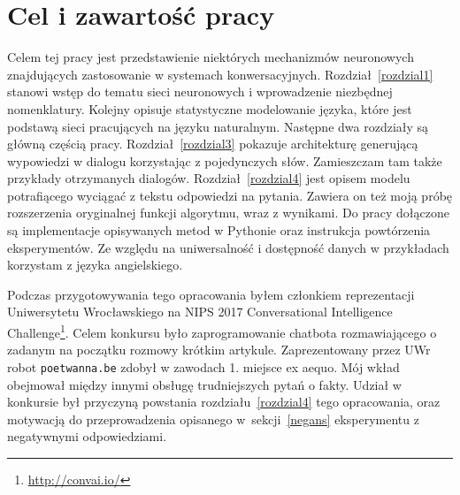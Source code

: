 \section{Cel i zawartość pracy} \label{celpracy}

Celem tej pracy jest przedstawienie niektórych mechanizmów neuronowych znajdujących zastosowanie w systemach konwersacyjnych. Rozdział~\ref{rozdzial1} stanowi wstęp do tematu sieci neuronowych i wprowadzenie niezbędnej nomenklatury. Kolejny opisuje statystyczne modelowanie języka, które jest podstawą sieci pracujących na języku naturalnym. Następne dwa rozdziały są główną częścią pracy. Rozdział~\ref{rozdzial3} pokazuje architekturę generującą wypowiedzi w dialogu korzystając z pojedynczych słów. Zamieszczam tam także przykłady otrzymanych dialogów. Rozdział~\ref{rozdzial4} jest opisem modelu potrafiącego wyciągać z tekstu odpowiedzi na pytania. Zawiera on też moją próbę rozszerzenia oryginalnej funkcji algorytmu, wraz z wynikami. Do pracy dołączone są implementacje opisywanych metod w Pythonie oraz instrukcja powtórzenia eksperymentów. Ze względu na uniwersalność i dostępność danych w przykładach korzystam z języka angielskiego.

Podczas przygotowywania tego opracowania byłem członkiem reprezentacji Uniwersytetu Wrocławskiego na NIPS 2017 Conversational Intelligence Challenge\footnote{\url{http://convai.io/}}. Celem konkursu było zaprogramowanie chatbota rozmawiającego o zadanym na początku rozmowy krótkim artykule. Zaprezentowany przez UWr robot \texttt{poetwanna.be} zdobył w zawodach 1. miejsce ex aequo. Mój wkład obejmował między innymi obsługę trudniejszych pytań o fakty. Udział w konkursie był przyczyną powstania rozdziału~\ref{rozdzial4} tego opracowania, oraz motywacją do przeprowadzenia opisanego w~sekcji~\ref{negans} eksperymentu z negatywnymi odpowiedziami.

